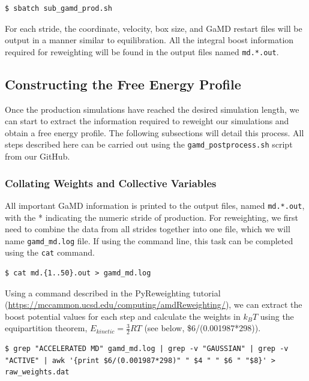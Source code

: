 \documentclass[9pt,tutorial,pubversion]{livecoms}
\begin{document}
\begin{lstlisting}[style=MyBash]
$ sbatch sub_gamd_prod.sh
\end{lstlisting}

For each stride, the coordinate, velocity, box size, and GaMD restart files will be output in a manner similar to equilibration. All the integral boost information required for reweighting will be found in the output files named \texttt{md.*.out}.

\subsection{Constructing the Free Energy Profile}
Once the production simulations have reached the desired simulation length, we can start to extract the information required to reweight our simulations and obtain a free energy profile. The following subsections will detail this process. All steps described here can be carried out using the \texttt{gamd\_postprocess.sh} script from our GitHub. 

\subsubsection{Collating Weights and Collective Variables}
All important GaMD information is printed to the output files, named \texttt{md.*.out}, with the * indicating the numeric stride of production. For reweighting, we first need to combine the data from all strides together into one file, which we will name \texttt{gamd\_md.log} file. If using the command line, this task can be completed using the \texttt{cat} command.

\begin{lstlisting}[style=MyBash]
$ cat md.{1..50}.out > gamd_md.log
\end{lstlisting}

Using a command described in the PyReweighting tutorial (\url{https://mccammon.ucsd.edu/computing/amdReweighting/}), we can extract the boost potential values for each step and calculate the weights in $k_{B}T$ using the equipartition theorem, $E_{kinetic} = \frac{3}{2}RT$ (see below, \$6/(0.001987*298)).

\begin{lstlisting}[style=MyBash]
$ grep "ACCELERATED MD" gamd_md.log | grep -v "GAUSSIAN" | grep -v "ACTIVE" | awk '{print $6/(0.001987*298)" " $4 " " $6 " "$8}' > raw_weights.dat
\end{lstlisting}
\end{document}
